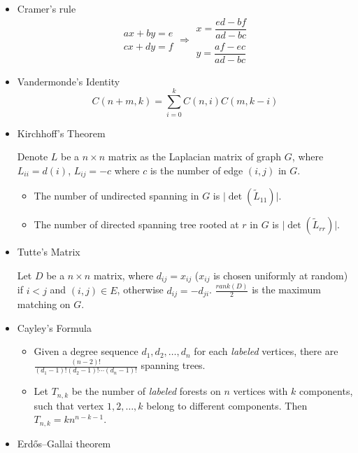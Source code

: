 \begin{itemize}
\item Cramer's rule
$$
\begin{aligned}ax+by=e\\cx+dy=f\end{aligned}
\Rightarrow
\begin{aligned}x=\dfrac{ed-bf}{ad-bc}\\y=\dfrac{af-ec}{ad-bc}\end{aligned}
$$

\item Vandermonde's Identity
$$
C(n + m, k) = \sum_{i=0}^k C(n, i)C(m, k - i)
$$

\item Kirchhoff's Theorem

Denote $L$ be a $n \times n$ matrix as the Laplacian matrix of graph $G$, where $L_{ii} = d(i)$, $L_{ij} = -c$ where $c$ is the number of edge $(i, j)$ in $G$.
\begin{itemize}
    \item The number of undirected spanning in $G$ is $\lvert \det(\tilde{L}_{11}) \rvert$.
    \item The number of directed spanning tree rooted at $r$ in $G$ is $\lvert \det(\tilde{L}_{rr}) \rvert$.
\end{itemize}

\item Tutte's Matrix

Let $D$ be a $n \times n$ matrix, where $d_{ij} = x_{ij}$ ($x_{ij}$ is chosen uniformly at random) if $i < j$ and $(i, j) \in E$, otherwise $d_{ij} = -d_{ji}$. $\frac{rank(D)}{2}$ is the maximum matching on $G$.

\item Cayley's Formula

\begin{itemize}
  \item Given a degree sequence $d_1, d_2, \ldots, d_n$ for each \textit{labeled} vertices, there are $\frac{(n - 2)!}{(d_1 - 1)!(d_2 - 1)!\cdots(d_n - 1)!}$ spanning trees.
  \item Let $T_{n, k}$ be the number of \textit{labeled} forests on $n$ vertices with $k$ components, such that vertex $1, 2, \ldots, k$ belong to different components. Then $T_{n, k} = kn^{n - k - 1}$.
\end{itemize}

\item Erdős–Gallai theorem 


\end{itemize}
